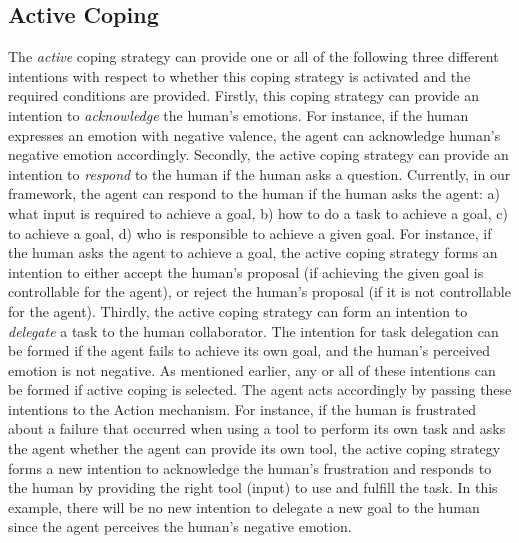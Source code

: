 \documentclass[12pt]{report}
\begin{document}
\subsection{Active Coping}
\label{sec:active-coping}
The \textit{active} coping strategy can provide one or all of the following
three different intentions with respect to whether this coping strategy is
activated and the required conditions are provided. Firstly, this coping
strategy can provide an intention to \textit{acknowledge} the human's emotions.
For instance, if the human expresses an emotion with negative valence, the agent
can acknowledge human's negative emotion accordingly. Secondly, the active
coping strategy can provide an intention to \textit{respond} to the human if
the human asks a question. Currently, in our framework, the agent can respond to
the human if the human asks the agent: a) what input is required to achieve a
goal, b) how to do a task to achieve a goal, c) to achieve a goal, d) who is
responsible to achieve a given goal. For instance, if the human asks the agent
to achieve a goal, the active coping strategy forms an intention to either
accept the human's proposal (if achieving the given goal is controllable for the
agent), or reject the human's proposal (if it is not controllable for the
agent). Thirdly, the active coping strategy can form an intention to
\textit{delegate} a task to the human collaborator. The intention for task
delegation can be formed if the agent fails to achieve its own goal, and the
human's perceived emotion is not negative. As mentioned earlier, any or all of
these intentions can be formed if active coping is selected. The agent acts
accordingly by passing these intentions to the Action mechanism. For instance,
if the human is frustrated about a failure that occurred when using a tool to
perform its own task and asks the agent whether the agent can provide its own
tool, the active coping strategy forms a new intention to acknowledge the
human's frustration and responds to the human by providing the right tool
(input) to use and fulfill the task. In this example, there will be no new
intention to delegate a new goal to the human since the agent perceives the
human's negative emotion.
\end{document}
